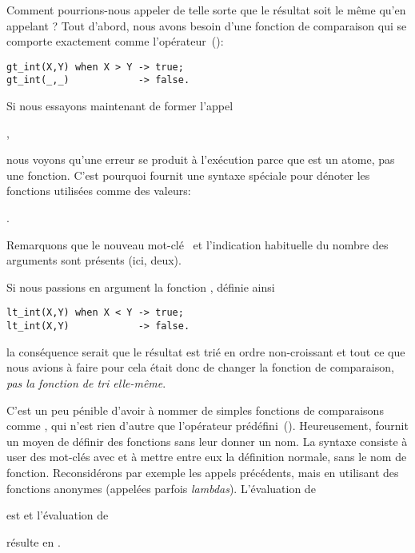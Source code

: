 Comment pourrions-nous appeler  de telle sorte que le
résultat soit le même qu'en appelant ? Tout d'abord,
nous avons besoin d'une fonction de comparaison qui se comporte
exactement comme l'opérateur~(\erlcode{>}):
\begin{verbatim}
gt_int(X,Y) when X > Y -> true;
gt_int(_,_)            -> false.
\end{verbatim}
Si nous essayons maintenant de former l'appel
\begin{center}
,
\end{center}
nous voyons qu'une erreur se produit à l'exécution parce que
 est un atome, pas une fonction. C'est pourquoi
\Erlang fournit une syntaxe spéciale pour dénoter les fonctions
utilisées comme des valeurs:
\begin{center}
.
\end{center}
Remarquons que le nouveau mot-clé~ et l'indication
habituelle du nombre des arguments sont présents (ici, deux).

Si nous passions en argument la fonction ,
définie ainsi
\begin{verbatim}
lt_int(X,Y) when X < Y -> true;
lt_int(X,Y)            -> false.
\end{verbatim}
la conséquence serait que le résultat est trié en ordre non-croissant
et tout ce que nous avions à faire pour cela était donc de changer la
fonction de comparaison, \emph{pas la fonction de tri elle-même}.

C'est un peu pénible d'avoir à nommer de simples fonctions de
comparaisons comme , qui n'est rien d'autre que
l'opérateur prédéfini~(\erlcode{<}). Heureusement, \Erlang fournit un
moyen de définir des fonctions sans leur donner un nom. La syntaxe
consiste à user des mot-clés  avec  et à
mettre entre eux la définition normale, sans le nom de
fonction. Reconsidérons par exemple les appels précédents, mais en
utilisant des fonctions anonymes (appelées parfois
\emph{lambdas}). L'évaluation de
\begin{center}
\end{center}
est \erlcode{[1,2,3,4,5]} et l'évaluation de
\begin{center}
\end{center}
résulte en \erlcode{[5,4,3,2,1]}.

